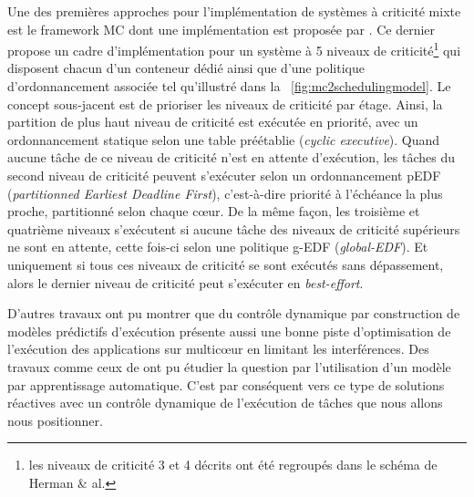 \documentclass[french, a4paper, 11pt, twoside, pdftex]{StyleThese}
\begin{document}
     Une des premières approches pour l'implémentation de systèmes à criticité mixte est le framework MC \cite{anderson_multicore_2009} dont une implémentation est proposée par \cite{herman_rtos_2012}. Ce dernier propose un cadre d'implémentation pour un système à 5 niveaux de criticité\footnote{les niveaux de criticité 3 et 4 décrits ont été regroupés dans le schéma de Herman \& al.} qui disposent chacun d'un conteneur dédié ainsi que d'une politique d'ordonnancement associée tel qu'illustré dans la ~\autoref{fig:mc2schedulingmodel}. Le concept sous-jacent est de prioriser les niveaux de criticité par étage. Ainsi, la partition de plus haut niveau de criticité est exécutée en priorité, avec un ordonnancement statique selon une table préétablie (\textit{cyclic executive}). Quand aucune tâche de ce niveau de criticité n'est en attente d'exécution, les tâches du second niveau de criticité peuvent s'exécuter selon un ordonnancement pEDF (\textit{partitionned Earliest Deadline First}), c'est-à-dire priorité à l'échéance la plus proche, partitionné selon chaque cœur. De la même façon, les troisième et quatrième niveaux s'exécutent si aucune tâche des niveaux de criticité supérieurs ne sont en attente, cette fois-ci selon une politique g-EDF (\textit{global-EDF}). Et uniquement si tous ces niveaux de criticité se sont exécutés sans dépassement, alors le dernier niveau de criticité peut s'exécuter en \textit{best-effort}. 

     
     D'autres travaux ont pu montrer que du contrôle dynamique par construction de modèles prédictifs d'exécution présente aussi une bonne piste d'optimisation de l'exécution des applications sur multicœur en limitant les interférences. Des travaux comme ceux de \cite{kim_application_2019} ont pu étudier la question par l'utilisation d'un modèle par apprentissage automatique. 
     C'est par conséquent vers ce type de solutions réactives avec un contrôle dynamique de l'exécution de tâches que nous allons nous positionner. 
\end{document}
